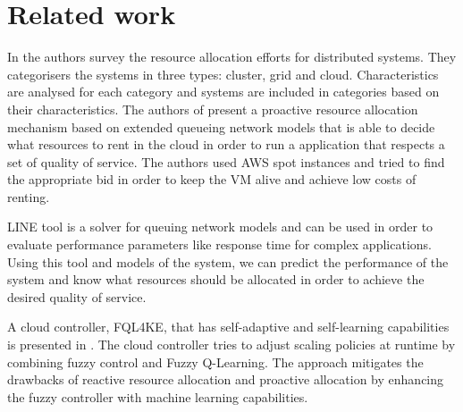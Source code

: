 \section{Related work}
\label{sec:relatesWork}

In \cite{Hussain2013} the authors survey the resource allocation efforts for distributed systems. They categorisers the systems in three types: cluster, grid and cloud. Characteristics are analysed for each category and systems are included in categories based on their characteristics. The authors of \cite{Dubois} present a proactive resource allocation mechanism based on extended queueing network models that is able to decide what resources to rent in the cloud in order to run a application that respects a set of quality of service. The authors used AWS spot instances and tried to find the appropriate bid in order to keep the VM alive and achieve low costs of renting.

LINE \cite{Perez2013} tool is a solver for queuing network models and can be used in order to evaluate performance parameters like response time for complex applications. Using this tool and models of the system, we can predict the performance of the system and know what resources should be allocated in order to achieve the desired quality of service.

A cloud controller, FQL4KE, that has self-adaptive and self-learning capabilities is presented in \cite{Jamshidi2015}. The cloud controller tries to adjust scaling policies at runtime by combining fuzzy control and Fuzzy Q-Learning. The approach mitigates the drawbacks of reactive resource allocation and proactive allocation by enhancing the fuzzy controller with machine learning capabilities.

